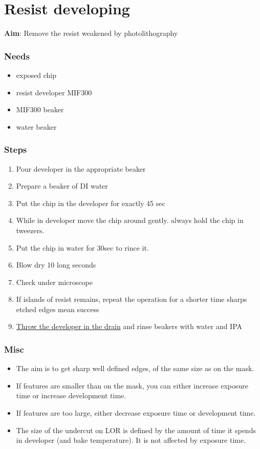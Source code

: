 \documentclass[12pt,a4paper]{report}
\begin{document}
\section{Resist developing}

\textbf{Aim}:
Remove the resist weakened by photolithography

\subsubsection{Needs}
\begin{itemize}[noitemsep]
\item exposed chip
\item resist developer MIF300
\item MIF300 beaker
\item water beaker
\end{itemize}

\subsubsection{Steps}
\begin{enumerate}
\item Pour developer in the appropriate beaker
\item Prepare a beaker of DI water
\item Put the chip in the developer for exactly 45 sec
\item While in developer move the chip around gently. always hold the chip in tweezers.
\item Put the chip in water for 30sec to rince it.
\item Blow dry 10 long seconds
\item Check under microscope
\item If islands of resist remains, repeat the operation for a shorter time
sharps etched edges mean success
\item \underline{Throw the developer in the drain} and rinse beakers with water and IPA
\end{enumerate}

\subsubsection{Misc}
\begin{itemize}
  \item The aim is to get sharp well defined edges, of the same size as on the mask.
  \item If features are smaller than on the mask, you can either increase exposure time or increase development time.
  \item If features are too large, either decrease exposure time or development time.
  \item The size of the undercut on LOR is defined by the amount of time it spends in developer (and bake temperature).
  It is not affected by exposure time.
\end{itemize}
\newpage
\end{document}
